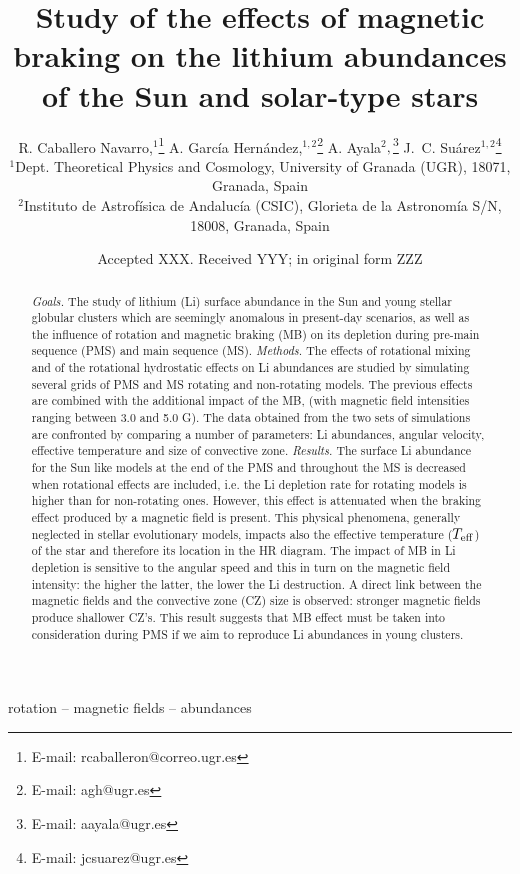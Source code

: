 \documentclass[fleqn,usenatbib]{mnras}
\title[Rotation, magnetic braking \& Li abundances]{Study of the effects of magnetic braking on the lithium abundances of the Sun and solar-type stars}
\author[R. Caballero Navarro et al.]{
R. Caballero Navarro,$^{1}$\thanks{E-mail: rcaballeron@correo.ugr.es}
A. Garc\'ia Hern\'andez,$^{1,2}$\thanks{E-mail: agh@ugr.es}
A. Ayala$^{2},$\thanks{E-mail: aayala@ugr.es}
J.~C. Su\'arez$^{1,2}$\thanks{E-mail: jcsuarez@ugr.es}
\\
$^{1}$Dept. Theoretical Physics and Cosmology, University of Granada (UGR), 18071, Granada, Spain\\
$^{2}$Instituto de Astrof\'isica de Andaluc\'ia (CSIC), Glorieta de la Astronom\'ia S/N, 18008, Granada, Spain\\
}
\date{Accepted XXX. Received YYY; in original form ZZZ}
\begin{document}
\label{firstpage}
\pagerange{\pageref{firstpage}--\pageref{lastpage}}
\maketitle

\begin{abstract}
\textit{Goals.} The study of lithium (Li) surface abundance in the Sun and young stellar globular clusters which are seemingly anomalous in present-day scenarios, as well as the influence of rotation and magnetic braking (MB) on its depletion during pre-main sequence (PMS) and main sequence (MS).
\newline\textit{Methods.} The effects of rotational mixing and of the rotational hydrostatic effects on Li abundances are studied by simulating several grids of PMS and MS rotating and non-rotating models. The previous effects are combined with the additional impact of the MB, (with magnetic field intensities ranging between 3.0 and 5.0 G). The data obtained from the two sets of simulations are confronted by comparing a number of parameters: Li abundances, angular velocity, effective temperature and size of convective zone.
\newline\textit{Results.} The surface Li abundance for the Sun like models at the end of the PMS and throughout the MS is decreased when rotational effects are included, i.e. the Li depletion rate for rotating models is higher than for non-rotating ones. However, this effect is attenuated when the braking effect produced by a magnetic field is present. This physical phenomena, generally neglected in stellar evolutionary models, impacts also the effective temperature ($T_{\mathrm{eff}}$) of the star and therefore its location in the HR diagram. The impact of MB in Li depletion is sensitive to the angular speed and this in turn on the magnetic field intensity: the higher the latter, the lower the Li destruction. A direct link between the magnetic fields and the convective zone (CZ) size is observed: stronger magnetic fields produce shallower CZ's. This result suggests that MB effect must be taken into consideration during PMS if we aim to reproduce Li abundances in young clusters.
\end{abstract}

\begin{keywords}
rotation -- magnetic fields -- abundances
\end{keywords}
\end{document}
